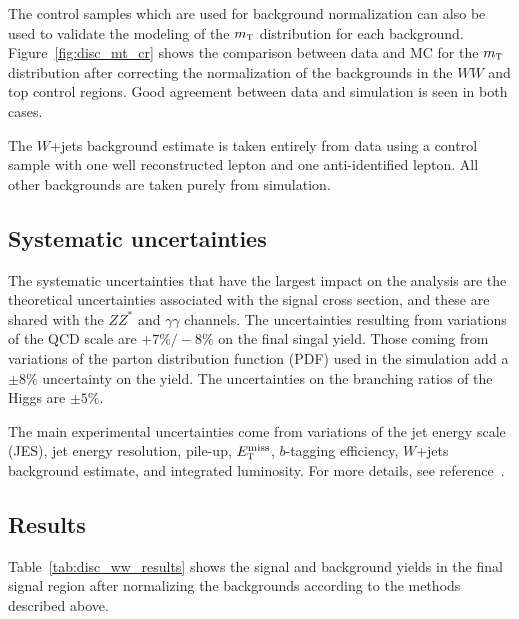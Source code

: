 The control samples which are used for background normalization can also be used to validate the modeling of the $m_{\textrm{\footnotesize\sc t}}$ distribution for each background. Figure~\ref{fig:disc_mt_cr} shows the comparison between data and MC for the $m_{\textrm{\footnotesize\sc t}}$ distribution after correcting the normalization of the backgrounds in the $WW$ and top control regions. Good agreement between data and simulation is seen in both cases. 

The $W$+jets background estimate is taken entirely from data using a control sample with one well reconstructed lepton and one anti-identified lepton. All other backgrounds are taken purely from simulation. 

\subsection{Systematic uncertainties}

The systematic uncertainties that have the largest impact on the analysis are the theoretical uncertainties associated with the signal cross section, and these are shared with the $ZZ^*$ and $\gamma\gamma$ channels. The uncertainties resulting from variations of the QCD scale are $+7\%/-8\%$ on the final singal yield. Those coming from variations of the parton distribution function (PDF) used in the simulation add a $\pm 8\%$ uncertainty on the yield. The uncertainties on the branching ratios of the Higgs are $\pm 5\%$. 

The main experimental uncertainties come from variations of the jet energy scale (JES), jet energy resolution, pile-up, $E_{\textrm{\footnotesize\sc t}}^{\rm miss}$, $b$-tagging efficiency, $W$+jets background estimate, and integrated luminosity. For more details, see reference~\cite{Discovery}.  

\subsection{Results}

Table~\ref{tab:disc_ww_results} shows the signal and background yields in the final signal region after normalizing the backgrounds according to the methods described above. 

